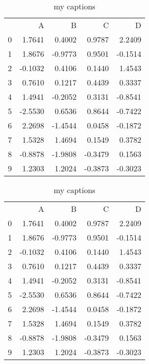\documentclass[10pt, oneside]{article}
\begin{document}
        
    \begin{table}
        \caption{my captions}
        \begin{tabular}{lrrrr}
        {} & {A} & {B} & {C} & {D} \\
        0 & 1.7641 & 0.4002 & 0.9787 & 2.2409 \\
        1 & 1.8676 & \color{red} -0.9773 & 0.9501 & \color{red} -0.1514 \\
        2 & \color{red} -0.1032 & 0.4106 & 0.1440 & 1.4543 \\
        3 & 0.7610 & 0.1217 & 0.4439 & 0.3337 \\
        4 & 1.4941 & \color{red} -0.2052 & 0.3131 & \color{red} -0.8541 \\
        5 & \color{red} -2.5530 & 0.6536 & 0.8644 & \color{red} -0.7422 \\
        6 & 2.2698 & \color{red} -1.4544 & 0.0458 & \color{red} -0.1872 \\
        7 & 1.5328 & 1.4694 & 0.1549 & 0.3782 \\
        8 & \color{red} -0.8878 & \color{red} -1.9808 & \color{red} -0.3479 & 0.1563 \\
        9 & 1.2303 & 1.2024 & \color{red} -0.3873 & \color{red} -0.3023 \\
        \end{tabular}
        \end{table}

    \begin{table}
        \caption{my captions}
        \begin{tabular}{lrrrr}
        {} & {A} & {B} & {C} & {D} \\
        0 & 1.7641 & 0.4002 & 0.9787 & 2.2409 \\
        1 & 1.8676 & -0.9773 & 0.9501 & -0.1514 \\
        2 & -0.1032 & 0.4106 & 0.1440 & 1.4543 \\
        3 & 0.7610 & 0.1217 & 0.4439 & 0.3337 \\
        4 & 1.4941 & -0.2052 & 0.3131 & -0.8541 \\
        5 & -2.5530 & 0.6536 & 0.8644 & -0.7422 \\
        6 & 2.2698 & -1.4544 & 0.0458 & -0.1872 \\
        7 & 1.5328 & 1.4694 & 0.1549 & 0.3782 \\
        8 & -0.8878 & -1.9808 & -0.3479 & 0.1563 \\
        9 & 1.2303 & 1.2024 & -0.3873 & -0.3023 \\
        \end{tabular}
        \end{table}
\end{document}
